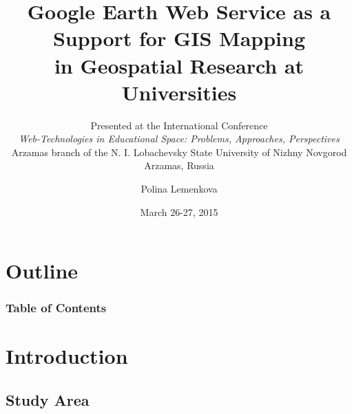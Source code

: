 \documentclass[pdflatex,compress,8pt,
	xcolor={dvipsnames,dvipsnames,svgnames,x11names,table},
	hyperref={colorlinks = true,
	breaklinks = true, 
	urlcolor = NavyBlue, 
	breaklinks = true}]{beamer}
\title[Google Earth Web Service as a Support for GIS Mapping]{Google Earth Web Service as a Support for GIS Mapping \\
in Geospatial Research at Universities}
\subtitle{\small{Presented at the International Conference} \\
\emph{Web-Technologies in Educational Space: Problems, Approaches, Perspectives} \\
\small{Arzamas branch of the N. I. Lobachevsky State University of Nizhny Novgorod \\
Arzamas, Russia}}
\author{Polina Lemenkova}
\date{March 26-27, 2015}
\begin{document}
\begin{frame}
           \titlepage
\end{frame}

\section*{Outline}
 \begin{frame}\frametitle{Table of Contents}
           \tableofcontents
\end{frame}

\section{Introduction}
\subsection{Study Area}
\end{document}
